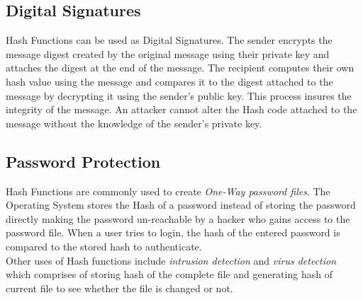 \documentclass{article}
\begin{document}
\subsection{Digital Signatures}
Hash Functions can be used as Digital Signatures. The sender encrypts the message digest created by the original message using their private key and attaches the digest at the end of the message. The recipient computes their own hash value using the message and compares it to the digest attached to the message by decrypting it using the sender's public key. This process insures the integrity of the message. An attacker cannot alter the Hash code attached to the message without the knowledge of the sender's private key.

\subsection{Password Protection}
Hash Functions are commonly used to create {\it One-Way password files}. The Operating System stores the Hash of a password instead of storing the password directly making the password un-reachable by a hacker who gains access to the password file. When a user tries to login, the hash of the entered password is compared to the stored hash to authenticate.\\
Other uses of Hash functions include {\it intrusion detection} and {\it virus detection} which comprises of storing hash of the complete file and generating hash of current file to see whether the file is changed or not.
\end{document}
